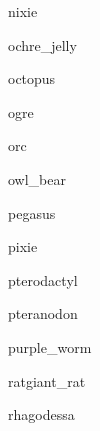 \documentclass[letterpaper,serif]{module}
\begin{document}
\begin{newmonster}{nixie}\end{newmonster}

\begin{newmonster}{ochre_jelly}\end{newmonster}

\begin{newmonster}{octopus}\end{newmonster}

\begin{newmonster}{ogre}\end{newmonster}

\begin{newmonster}{orc}\end{newmonster}

\begin{newmonster}{owl_bear}\end{newmonster}

\begin{newmonster}{pegasus}\end{newmonster}

\begin{newmonster}{pixie}\end{newmonster}


\begin{newmonster}{pterodactyl}\end{newmonster}

\begin{newmonster}{pteranodon}\end{newmonster}

\begin{newmonster}{purple_worm}\end{newmonster}


\begin{newmonster2}{rat}{giant_rat}
\lipsum[1]
\end{newmonster2}

\begin{newmonster}{rhagodessa}\end{newmonster}
\end{document}
